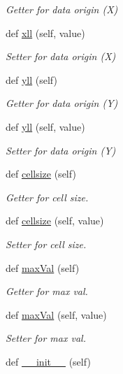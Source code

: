 \begin{DoxyCompactItemize}
\begin{DoxyCompactList}\small\item\em Getter for data origin (X) \end{DoxyCompactList}\item 
def \hyperlink{classbridges_1_1data__src__dependent_1_1elevation_1_1_ele_data_a1fb07f071f9c21eb6b4169b47ebbeff2}{xll} (self, value)
\begin{DoxyCompactList}\small\item\em Setter for data origin (X) \end{DoxyCompactList}\item 
def \hyperlink{classbridges_1_1data__src__dependent_1_1elevation_1_1_ele_data_ab6614ee1ad466541a0e94e33d9fadcdd}{yll} (self)
\begin{DoxyCompactList}\small\item\em Getter for data origin (Y) \end{DoxyCompactList}\item 
def \hyperlink{classbridges_1_1data__src__dependent_1_1elevation_1_1_ele_data_aa5ccf794da0100fc90874290f1c4f118}{yll} (self, value)
\begin{DoxyCompactList}\small\item\em Setter for data origin (Y) \end{DoxyCompactList}\item 
def \hyperlink{classbridges_1_1data__src__dependent_1_1elevation_1_1_ele_data_ab8ca9c8913aae0d352e4472069d24bfe}{cellsize} (self)
\begin{DoxyCompactList}\small\item\em Getter for cell size. \end{DoxyCompactList}\item 
def \hyperlink{classbridges_1_1data__src__dependent_1_1elevation_1_1_ele_data_a70f2d2999f6444b12a43e32f78e618fc}{cellsize} (self, value)
\begin{DoxyCompactList}\small\item\em Setter for cell size. \end{DoxyCompactList}\item 
def \hyperlink{classbridges_1_1data__src__dependent_1_1elevation_1_1_ele_data_a199ae38c535c5f54c86f7493d3fb4ac0}{max\+Val} (self)
\begin{DoxyCompactList}\small\item\em Getter for max val. \end{DoxyCompactList}\item 
def \hyperlink{classbridges_1_1data__src__dependent_1_1elevation_1_1_ele_data_a992a646ecb76f31fa84cd5fe149eb316}{max\+Val} (self, value)
\begin{DoxyCompactList}\small\item\em Setter for max val. \end{DoxyCompactList}\item 
def \hyperlink{classbridges_1_1data__src__dependent_1_1elevation_1_1_ele_data_a8fbffdee46235f5698da66c075676cb4}{\+\_\+\+\_\+init\+\_\+\+\_\+} (self)
\end{DoxyCompactItemize}
